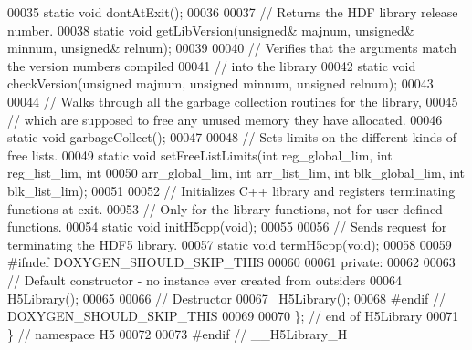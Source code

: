 \begin{DoxyCode}
00035         \textcolor{keyword}{static} \textcolor{keywordtype}{void} dontAtExit();
00036 
00037         \textcolor{comment}{// Returns the HDF library release number.}
00038         \textcolor{keyword}{static} \textcolor{keywordtype}{void} getLibVersion(\textcolor{keywordtype}{unsigned}& majnum, \textcolor{keywordtype}{unsigned}& minnum, \textcolor{keywordtype}{unsigned}& relnum);
00039 
00040         \textcolor{comment}{// Verifies that the arguments match the version numbers compiled}
00041         \textcolor{comment}{// into the library}
00042         \textcolor{keyword}{static} \textcolor{keywordtype}{void} checkVersion(\textcolor{keywordtype}{unsigned} majnum, \textcolor{keywordtype}{unsigned} minnum, \textcolor{keywordtype}{unsigned} relnum);
00043 
00044         \textcolor{comment}{// Walks through all the garbage collection routines for the library,}
00045         \textcolor{comment}{// which are supposed to free any unused memory they have allocated.}
00046         \textcolor{keyword}{static} \textcolor{keywordtype}{void} garbageCollect();
00047 
00048         \textcolor{comment}{// Sets limits on the different kinds of free lists.}
00049         \textcolor{keyword}{static} \textcolor{keywordtype}{void} setFreeListLimits(\textcolor{keywordtype}{int} reg\_global\_lim, \textcolor{keywordtype}{int} reg\_list\_lim, \textcolor{keywordtype}{int}
00050         arr\_global\_lim, \textcolor{keywordtype}{int} arr\_list\_lim, \textcolor{keywordtype}{int} blk\_global\_lim, \textcolor{keywordtype}{int} blk\_list\_lim);
00051 
00052         \textcolor{comment}{// Initializes C++ library and registers terminating functions at exit.}
00053         \textcolor{comment}{// Only for the library functions, not for user-defined functions.}
00054         \textcolor{keyword}{static} \textcolor{keywordtype}{void} initH5cpp(\textcolor{keywordtype}{void});
00055 
00056         \textcolor{comment}{// Sends request for terminating the HDF5 library.}
00057         \textcolor{keyword}{static} \textcolor{keywordtype}{void} termH5cpp(\textcolor{keywordtype}{void});
00058 
00059 \textcolor{preprocessor}{#ifndef DOXYGEN\_SHOULD\_SKIP\_THIS}
00060 
00061    \textcolor{keyword}{private}:
00062 
00063         \textcolor{comment}{// Default constructor - no instance ever created from outsiders}
00064         H5Library();
00065 
00066         \textcolor{comment}{// Destructor}
00067         ~H5Library();
00068 \textcolor{preprocessor}{#endif // DOXYGEN\_SHOULD\_SKIP\_THIS}
00069 
00070 \}; \textcolor{comment}{// end of H5Library}
00071 \} \textcolor{comment}{// namespace H5}
00072 
00073 \textcolor{preprocessor}{#endif // \_\_H5Library\_H}
\end{DoxyCode}
